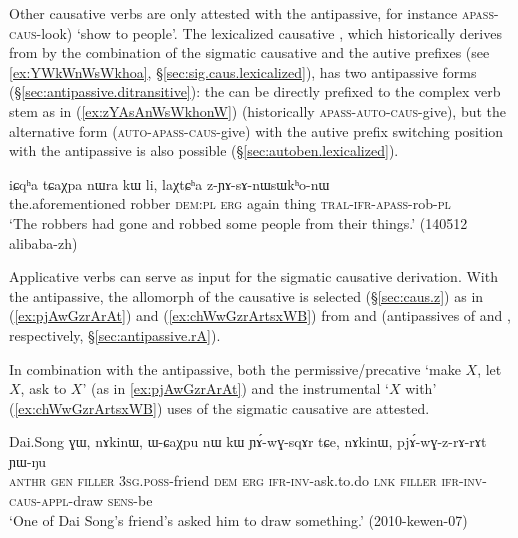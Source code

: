 Other causative verbs are only attested with the  antipassive, for instance   \textsc{apass}-\textsc{caus}-look) `show to people'. The lexicalized causative  , which historically derives from  by the combination of the sigmatic causative  and the autive  prefixes (see \ref{ex:YWkWnWsWkhoa}, §\ref{sec:sig.caus.lexicalized}), has two  antipassive forms (§\ref{sec:antipassive.ditransitive}): the  can be directly prefixed to the complex verb stem as in  (\ref{ex:zYAsAnWsWkhonW}) (historically  \textsc{apass}-\textsc{auto}-\textsc{caus}-give), but the alternative form  (\textsc{auto}-\textsc{apass}-\textsc{caus}-give) with the autive prefix  switching position with the antipassive is also possible  (§\ref{sec:autoben.lexicalized}).
 
\begin{exe}
\ex  \label{ex:zYAsAnWsWkhonW}
\gll   iɕqʰa tɕaχpa nɯra kɯ li, laχtɕʰa z-ɲɤ-sɤ-nɯsɯkʰo-nɯ  \\
the.aforementioned robber \textsc{dem}:\textsc{pl} \textsc{erg} again thing \textsc{tral}-\textsc{ifr}-\textsc{apass}-rob-\textsc{pl}   \\
\glt `The robbers had gone and robbed some people from their things.' (140512 alibaba-zh) 
\end{exe}  

Applicative verbs can serve as input for the sigmatic causative derivation. With the  antipassive, the  allomorph of the causative is selected (§\ref{sec:caus.z}) as in   (\ref{ex:pjAwGzrArAt}) and  (\ref{ex:chWwGzrArtsxWB})  from  and  (antipassives of  and , respectively, §\ref{sec:antipassive.rA}). 

In combination with the antipassive, both the permissive/precative `make $X$, let $X$, ask to $X$' (as in \ref{ex:pjAwGzrArAt}) and the instrumental `$X$ with' (\ref{ex:chWwGzrArtsxWB}) uses of the sigmatic causative are attested.

\begin{exe}
\ex  \label{ex:pjAwGzrArAt}
\gll  Dai.Song ɣɯ, nɤkinɯ, ɯ-ɕaχpu nɯ kɯ ɲɤ́-wɣ-sqɤr tɕe, nɤkinɯ, pjɤ́-wɣ-z-rɤ-rɤt ɲɯ-ŋu \\
\textsc{anthr} \textsc{gen} \textsc{filler} \textsc{3sg}.\textsc{poss}-friend \textsc{dem} \textsc{erg} \textsc{ifr}-\textsc{inv}-ask.to.do \textsc{lnk} \textsc{filler} \textsc{ifr}-\textsc{inv}-\textsc{caus}-\textsc{appl}-draw \textsc{sens}-be \\
\glt `One of Dai Song's friend's asked him to draw something.' (2010-kewen-07)
\end{exe}  
 
